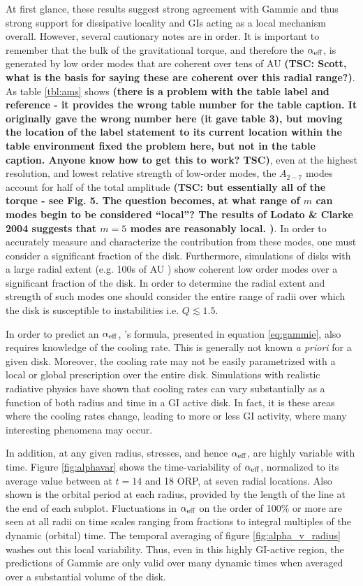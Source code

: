 \documentclass[manuscript]{aastex}
\begin{document}
At first glance, these results suggest strong agreement with Gammie and thus strong support for dissipative
locality and GIs acting as a local mechanism overall.  However, several cautionary notes are in order. It is important to remember that the bulk of the gravitational torque, and therefore the $\alpha_{\rm{eff}}$, is generated by low order modes that are coherent over tens of AU {\bf (TSC: Scott, what is the basis for saying these are coherent over this radial range?)}. As table \ref{tbl:ams} shows {\bf (there is a problem with the table label and reference - it provides the wrong table number for the table caption.  It originally gave the wrong number here (it gave table 3), but moving the location of the label statement to its current location within the table environment fixed the problem here, but not in the table caption. Anyone know how to get this to work? TSC)}, even at the highest resolution, and lowest relative strength of low-order modes, the $A_{2-7}$ modes account for half of the total amplitude {\bf (TSC: but essentially all of the torque - see Fig. 5.  The question becomes, at what range of $m$ can modes begin to be considered ``local''?  The results of Lodato \& Clarke 2004 suggests that $m = 5$ modes are
reasonably local. )}. In order to accurately measure and characterize the contribution from these modes, one must consider a significant fraction of the disk. Furthermore, simulations of disks with a large radial extent (e.g. 100s of AU \citep{boley2009}) show coherent low order modes over a significant fraction of the disk. In order to determine the radial extent and strength of such modes one should consider the entire range of radii over which the disk is susceptible to instabilities i.e. $Q \lesssim 1.5$.  

In order to predict an $\alpha_{\rm{eff}}$, \citeauthor{gammie2001}'s formula, presented in equation \eqref{eq:gammie}, also requires knowledge of the cooling rate. This is generally not known {\it a priori} for a given disk. Moreover, the cooling rate may not be easily parametrized with a local or global prescription over the entire disk. Simulations with realistic radiative physics \citep{boley2006} have shown that cooling rates can vary substantially as a function of both radius and time in a GI active disk. In fact, it is these areas where the cooling rates change, leading to more or less GI activity, where many interesting phenomena may occur. 

In addition, at any given radius, 
stresses, and hence $\alpha_{\rm{eff}}$, are highly variable with time.
Figure \ref{fig:alphavar} shows the time-variability of $\alpha_{\rm{eff}}$, 
normalized to its average value between at $t = 14$ and 18 ORP, at seven radial locations.   
Also shown is the orbital period at each radius, provided by the length of the line at the end of each subplot. 
Fluctuations in $\alpha_{\rm{eff}}$
on the order of 100\% or more are seen at all radii
on  time scales ranging from fractions to integral multiples of the dynamic (orbital) time.  The temporal averaging
of figure \ref{fig:alpha_v_radius} washes out this local variability.
Thus,
even in this highly GI-active region, the predictions of Gammie are only valid over many dynamic times 
when averaged over a substantial volume of the disk.
\end{document}
